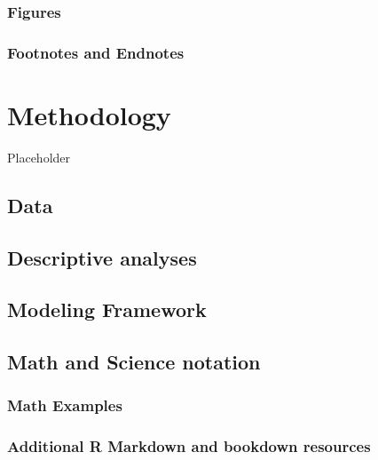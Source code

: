 \documentclass[12pt,oneside]{chicagocapstone}
\begin{document}
\subsection*{Figures}\label{figures}

\subsection*{Footnotes and Endnotes}\label{footnotes-and-endnotes}

\chapter*{Methodology}\label{methodology}

Placeholder

\section*{Data}\label{methodology-data}

\section*{Descriptive analyses}\label{methodology-descriptive}

\section*{Modeling Framework}\label{methodology-modeling}

\section*{Math and Science notation}\label{math-sci}

\subsection*{Math Examples}\label{math-examples}

\subsection*{Additional R Markdown and bookdown
resources}\label{additional-r-markdown-and-bookdown-resources}
\end{document}
